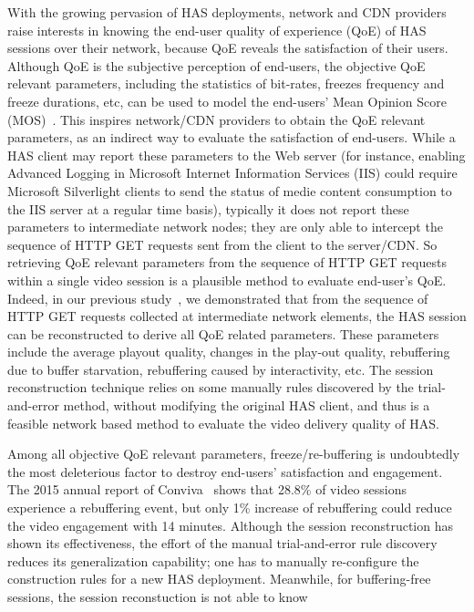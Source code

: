 \documentclass[journal]{IEEEtran}
\begin{document}
With the growing pervasion of HAS deployments, network and CDN providers raise interests in knowing the end-user quality of experience (QoE) of HAS sessions over their network, because QoE reveals the satisfaction of their users. Although QoE is the subjective perception of end-users, the objective QoE relevant parameters, including the statistics of bit-rates, freezes frequency and freeze durations, etc, can be used to model the end-users' Mean Opinion Score (MOS)~\cite{de2013model}. This inspires network/CDN providers to obtain the QoE relevant parameters, as an indirect way to evaluate the satisfaction of end-users. While a HAS client may report these parameters to the Web server (for instance, enabling Advanced Logging in Microsoft Internet Information Services (IIS) could require Microsoft Silverlight clients to send the status of medie content consumption to the IIS server at a regular time basis), typically it does not report these parameters to intermediate network nodes; they are only able to intercept the sequence of HTTP GET requests sent from the client to the server/CDN. So retrieving QoE relevant parameters from the sequence of HTTP GET requests within a single video session is a plausible method to evaluate end-user's QoE. 
Indeed, in our previous study~\cite{Huysegems:2012:SRH:2330748.2330763}, we demonstrated that from the sequence of HTTP GET requests collected at intermediate network elements, the HAS session can be reconstructed to derive all QoE related parameters. These parameters include the average playout quality, changes in the play-out quality, rebuffering due to buffer starvation, rebuffering caused by interactivity, etc. The session reconstruction technique relies on some manually rules discovered by the trial-and-error method, without modifying the original HAS client, and thus is a feasible network based method to evaluate the video delivery quality of HAS.

Among all objective QoE relevant parameters, freeze/re-buffering is undoubtedly the most deleterious factor to destroy end-users' satisfaction and engagement. The 2015 annual report of Conviva~\cite{convivaC:2015} shows that 28.8\% of video sessions experience a rebuffering event, but only 1\% increase of rebuffering could reduce the video engagement with 14 minutes. Although the session reconstruction has shown its effectiveness, the effort of the manual trial-and-error rule discovery reduces its generalization capability; one has to manually re-configure the construction rules for a new HAS deployment. Meanwhile, for buffering-free sessions, the session reconstuction is not able to know   
\end{document}
